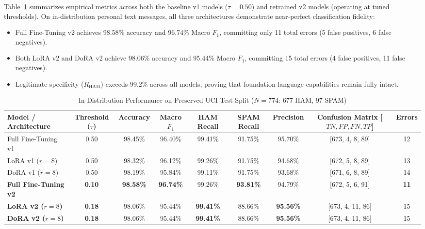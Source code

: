 \documentclass[conference]{IEEEtran}
\begin{document}
Table~\ref{tab:uci_test_results} summarizes empirical metrics across both the baseline v1 models ($\tau = 0.50$) and retrained v2 models (operating at tuned thresholds). On in-distribution personal text messages, all three architectures demonstrate near-perfect classification fidelity:
\begin{itemize}
    \item Full Fine-Tuning v2 achieves 98.58\% accuracy and 96.74\% Macro $F_1$, committing only 11 total errors (5 false positives, 6 false negatives).
    \item Both LoRA v2 and DoRA v2 achieve 98.06\% accuracy and 95.44\% Macro $F_1$, committing 15 total errors (4 false positives, 11 false negatives).
    \item Legitimate specificity ($R_{\text{HAM}}$) exceeds 99.2\% across all models, proving that foundation language capabilities remain fully intact.
\end{itemize}

\begin{table}[t]
\caption{In-Distribution Performance on Preserved UCI Test Split ($N=774$: 677 HAM, 97 SPAM)}
\label{tab:uci_test_results}
\centering
\begin{tabularx}{\textwidth}{lcccccccc}
\toprule
\textbf{Model / Architecture} & \textbf{Threshold ($\tau$)} & \textbf{Accuracy} & \textbf{Macro $F_1$} & \textbf{HAM Recall} & \textbf{SPAM Recall} & \textbf{Precision} & \textbf{Confusion Matrix [$TN, FP, FN, TP$]} & \textbf{Errors} \\
\midrule
Full Fine-Tuning v1 & 0.50 & 98.45\% & 96.40\% & 99.41\% & 91.75\% & 95.70\% & [673, 4, 8, 89] & 12 \\
LoRA v1 ($r=8$) & 0.50 & 98.32\% & 96.12\% & 99.26\% & 91.75\% & 94.68\% & [672, 5, 8, 89] & 13 \\
DoRA v1 ($r=8$) & 0.50 & 98.19\% & 95.84\% & 99.11\% & 91.75\% & 93.68\% & [671, 6, 8, 89] & 14 \\
\midrule
\textbf{Full Fine-Tuning v2} & \textbf{0.10} & \textbf{98.58\%} & \textbf{96.74\%} & 99.26\% & \textbf{93.81\%} & 94.79\% & [672, 5, 6, 91] & \textbf{11} \\
\textbf{LoRA v2 ($r=8$)} & \textbf{0.18} & 98.06\% & 95.44\% & \textbf{99.41\%} & 88.66\% & \textbf{95.56\%} & [673, 4, 11, 86] & 15 \\
\textbf{DoRA v2 ($r=8$)} & \textbf{0.18} & 98.06\% & 95.44\% & \textbf{99.41\%} & 88.66\% & \textbf{95.56\%} & [673, 4, 11, 86] & 15 \\
\bottomrule
\end{tabularx}
\end{table}
\end{document}
